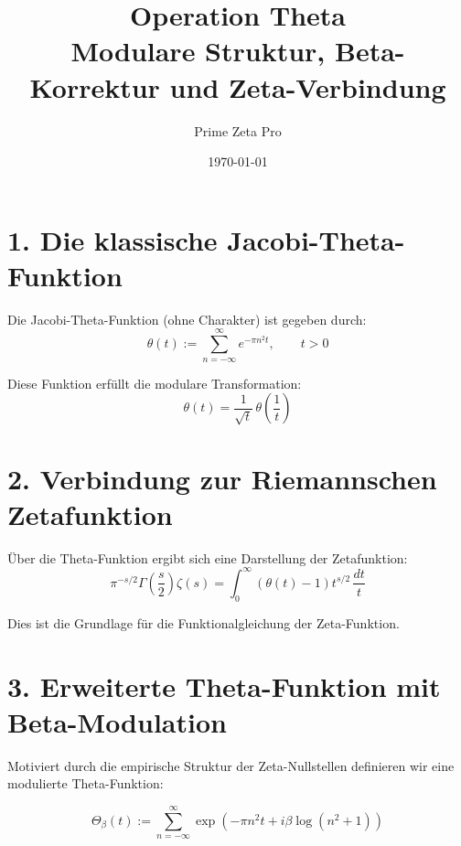\documentclass[12pt]{article}
\title{Operation Theta\\[1ex] \large Modulare Struktur, Beta-Korrektur und Zeta-Verbindung}
\author{Prime Zeta Pro}
\date{\today}
\begin{document}
\maketitle

\section*{1. Die klassische Jacobi-Theta-Funktion}

Die Jacobi-Theta-Funktion (ohne Charakter) ist gegeben durch:
\begin{equation}
\theta(t) := \sum_{n=-\infty}^{\infty} e^{-\pi n^2 t}, \qquad t > 0
\end{equation}

Diese Funktion erfüllt die modulare Transformation:
\begin{equation}
\theta(t) = \frac{1}{\sqrt{t}} \, \theta\left( \frac{1}{t} \right)
\end{equation}

\vspace{1em}

\section*{2. Verbindung zur Riemannschen Zetafunktion}

Über die Theta-Funktion ergibt sich eine Darstellung der Zetafunktion:
\begin{equation}
\pi^{-s/2} \Gamma\left( \frac{s}{2} \right) \zeta(s) = \int_0^\infty \left( \theta(t) - 1 \right) t^{s/2} \, \frac{dt}{t}
\end{equation}

Dies ist die Grundlage für die Funktionalgleichung der Zeta-Funktion.

\vspace{1em}

\section*{3. Erweiterte Theta-Funktion mit Beta-Modulation}

Motiviert durch die empirische Struktur der Zeta-Nullstellen definieren wir eine modulierte Theta-Funktion:

\begin{equation}
\Theta_{\beta}(t) := \sum_{n=-\infty}^{\infty} 
\exp\left( -\pi n^2 t + i \beta \log(n^2 + 1) \right)
\label{eq:theta_beta}
\end{equation}
\end{document}
